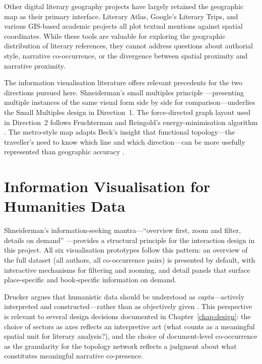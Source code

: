 \documentclass[logo,msc]{infthesis}
\begin{document}
Other digital literary geography projects have largely retained the geographic map as their primary interface. Literary Atlas, Google's Literary Trips, and various GIS-based academic projects all plot textual mentions against spatial coordinates. While these tools are valuable for exploring the geographic distribution of literary references, they cannot address questions about authorial style, narrative co-occurrence, or the divergence between spatial proximity and narrative proximity.
 
The information visualisation literature offers relevant precedents for the two directions pursued here. Shneiderman's small multiples principle \cite{tufte1983}---presenting multiple instances of the same visual form side by side for comparison---underlies the Small Multiples design in Direction~1. The force-directed graph layout used in Direction~2 follows Fruchterman and Reingold's energy-minimisation algorithm \cite{fruchterman1991}. The metro-style map adapts Beck's insight that functional topology---the traveller's need to know which line and which direction---can be more usefully represented than geographic accuracy \cite{beck1933}.
 
\section{Information Visualisation for Humanities Data}
 
Shneiderman's information-seeking mantra---``overview first, zoom and filter, details on demand'' \cite{shneiderman1996}---provides a structural principle for the interaction design in this project. All six visualisation prototypes follow this pattern: an overview of the full dataset (all authors, all co-occurrence pairs) is presented by default, with interactive mechanisms for filtering and zooming, and detail panels that surface place-specific and book-specific information on demand.
 
Drucker argues that humanistic data should be understood as \emph{capta}---actively interpreted and constructed---rather than as objectively given \cite{drucker2011}. This perspective is relevant to several design decisions documented in Chapter~\ref{chap:design}: the choice of sectors as axes reflects an interpretive act (what counts as a meaningful spatial unit for literary analysis?), and the choice of document-level co-occurrence as the granularity for the topology network reflects a judgment about what constitutes meaningful narrative co-presence.
 
\end{document}
